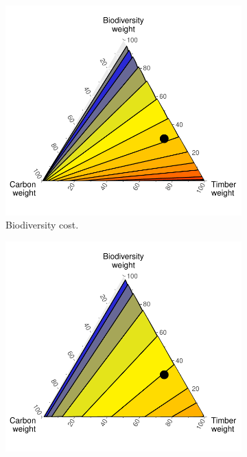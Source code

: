 \documentclass{article}
\begin{document}
\begin{figure}
    \centering
    \begin{subfigure}[b]{0.45\textwidth}
        \includegraphics[width=\textwidth]{graphs/biodivLoss.pdf}
       \caption{Biodiversity cost.}
        \label{fig:costBiod}
    \end{subfigure}
    \begin{subfigure}[b]{0.45\textwidth}
        \includegraphics[width=\textwidth]{graphs/carbonLoss.pdf}

\end{subfigure}
\end{figure}
\end{document}
